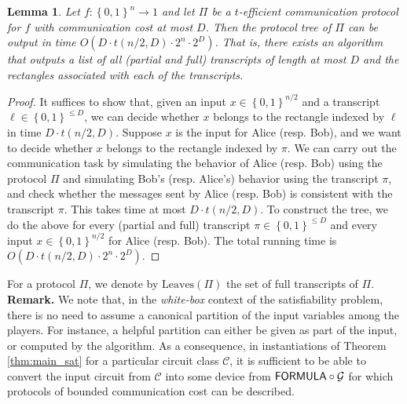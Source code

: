 \documentclass[10pt,a4paper]{article}
\newtheorem{lemma}[theorem]{Lemma}
\newcommand{\bool}{\left\{0,1\right\}}
\newcommand{\FORMULA}{{\sf FORMULA}}
\newcommand{\cprn}[1]{\!\left(#1\right)}
\begin{document}
	\begin{lemma}\label{lem:sat-time-efficient}
        Let $f\colon\bool^n\to 1$ and let $\Pi$ be a $t$-efficient communication protocol for $f$ with communication cost at most $D$. Then the protocol tree of $\Pi$ can be output in time $O\left(D\cdot t\cprn{n/2,D}\cdot2^{n}\cdot2^D\right)$. That is, there exists an algorithm that outputs a list of all (partial and full) transcripts of length at most $D$ and the rectangles associated with each of the transcripts.
	\end{lemma}
	
	\begin{proof}
	    It suffices to show that, given an input $x\in\bool^{n/2}$ and a transcript $\ell\in\bool^{\leq D}$, we can decide whether $x$ belongs to the rectangle indexed by $\ell$ in time $D\cdot t\cprn{n/2,D}$.
	    Suppose $x$ is the input for Alice (resp. Bob), and we want to decide whether $x$ belongs to the rectangle indexed by $\pi$. We can carry out the communication task by simulating the behavior of Alice (resp. Bob) using the protocol $\Pi$ and simulating Bob's (resp. Alice's) behavior using the transcript $\pi$, and check whether the messages sent by Alice (resp. Bob) is consistent with the transcript $\pi$. This takes time at most $D\cdot t\cprn{n/2,D}$. To construct the tree, we do the above for every (partial and full) transcript $\pi\in\bool^{\leq D}$ and every input $x\in\bool^{n/2}$ for Alice (resp. Bob). The total running time is $O\left(D\cdot t\cprn{n/2,D}\cdot2^{n}\cdot2^D\right)$.
	\end{proof}
	
	For a protocol $\Pi$, we denote by $\mathrm{Leaves}(\Pi)$ the set of full transcripts of $\Pi$.\\
	
	\noindent \textbf{Remark.} We note that, in the \emph{white-box} context of the satisfiability problem, there is no need to assume a canonical partition of the input variables among the  players. For instance, a helpful partition can either be given as part of the input, or computed by the algorithm. As a consequence, in instantiations of Theorem \ref{thm:main_sat} for a particular circuit class $\mathcal{C}$, it is sufficient to be able to convert the input circuit from $\mathcal{C}$ into some device from $\FORMULA \circ \mathcal{G}$ for which protocols of bounded communication cost can be described.
	
%
%
%
%
%
%
%
	
%
%
	    
\end{document}
